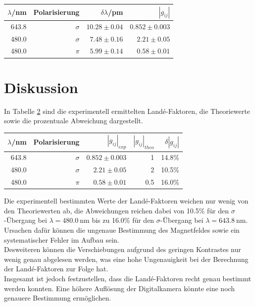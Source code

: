 \documentclass[captions=tableheading]{scrartcl}
\begin{document}
\begin{table}[H]
	\centering
	\label{tab:lande}
	\begin{tabular}{r r r r}
		\toprule
		$\lambda$/nm & Polarisierung & $\delta \lambda$/pm & $\left| g_{ij}\right|$ \\
		\midrule
		643.8 & $\sigma$ & $10.28\pm0.04$ & $0.852\pm0.003$ \\
		480.0 & $\sigma$ & $ 7.48\pm0.16$ & $2.21\pm0.05$ \\
		480.0 & $\pi$	 & $ 5.99\pm0.14$ & $0.58\pm0.01$ \\
		\bottomrule
	\end{tabular}
\end{table}
		
\section{Diskussion}
In Tabelle \ref{tab:literatur} sind die experimentell ermittelten Landé-Faktoren, die Theoriewerte sowie die prozentuale Abweichung dargestellt.
\begin{table}[H]
	\centering
	\label{tab:literatur}
	\begin{tabular}{r r r r r}
		\toprule
		$\lambda$/nm & Polarisierung & $\left| g_{ij}\right|_{exp}$ & $\left| g_{ij}\right|_{theo}$ & $\delta \left|g_{ij}\right|$ \\
		\midrule
		643.8 & $\sigma$ &  $0.852\pm0.003$ & 1 & 14.8\% \\
		480.0 & $\sigma$ &  $2.21\pm0.05$ & 2 & 10.5\% \\
		480.0 & $\pi$	 &  $0.58\pm0.01$ & 0.5 & 16.0\% \\
		\bottomrule
	\end{tabular}
\end{table}
Die experimentell bestimmten Werte der Landé-Faktoren weichen nur wenig von den Theoriewerten ab, die Abweichungen reichen dabei von 10.5\% für den $\sigma$-Übergang bei $\lambda=\SI{480.0}{\nano\metre}$ bis zu 16.0\% für den $\sigma$-Übergang bei $\lambda=\SI{643.8}{\nano\metre}$. Ursachen dafür können die ungenaue Bestimmung des Magnetfeldes sowie ein systematischer Fehler im Aufbau sein. \\
Desweiteren können die Verschiebungen aufgrund des geringen Kontrastes nur wenig genau abgelesen werden, was eine hohe Ungenauigkeit bei der Berechnung der Landé-Faktoren zur Folge hat. \\
Insgesamt ist jedoch festzustellen, dass die Landé-Faktoren recht genau bestimmt werden konnten. Eine höhere Auflösung der Digitalkamera könnte eine noch genauere Bestimmung ermöglichen.
\end{document}
